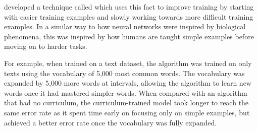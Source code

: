\textcite{bengio2009} developed a technique called  which uses this fact to improve training by starting with easier training examples and slowly working towards more difficult training examples.
In a similar way to how neural networks were inspired by biological phenomena, this was inspired by how humans are taught simple examples before moving on to harder tasks.

For example, when trained on a text dataset, the algorithm was trained on only texts using the vocabulary of 5,000 most common words.
The vocabulary was expanded by 5,000 more words at intervals, allowing the algorithm to learn new words once it had mastered simpler words.
When compared with an algorithm that had no curriculum, the curriculum-trained model took longer to reach the same error rate as it spent time early on focusing only on simple examples, but achieved a better error rate once the vocabulary was fully expanded.
